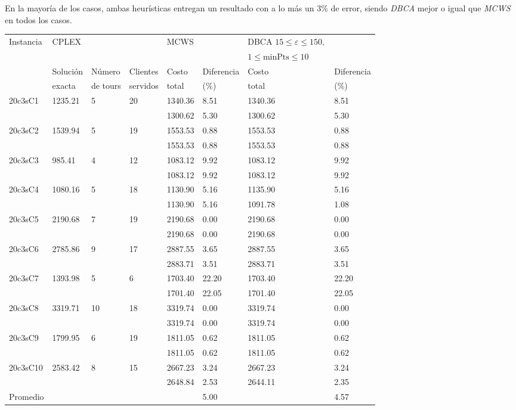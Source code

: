 \documentclass[letter, 10pt]{article}
\begin{document}
\begin{itemize}
\bigskip
En la mayoría de los casos, ambas heurísticas entregan un resultado con a lo más un \(3\)\% de error,
siendo \textit{DBCA} mejor o igual que \textit{MCWS} en todos los casos.

\begin{tabular}{|l|lll|ll|ll|}
\hline
Instancia & CPLEX &&&MCWS&&DBCA \(15 \leq \varepsilon \leq 150,\) &\\ 
			&	&&&&& \(1 \leq \mbox{minPts} \leq 10\)& \\ \hline
		& Solución  & Número & Clientes & Costo  & Diferencia & Costo & Diferencia \\
		& exacta		& de tours 	& servidos & total & (\%)&total & (\%)\\ \hline
20c3sC1 & 1235.21 & 5 & 20 & 1340.36 & 8.51 & 1340.36 & 8.51 \\
		&			&	&	&1300.62 & 5.30 & 1300.62 & 5.30 \\ \hline
20c3sC2 & 1539.94 & 5 & 19 & 1553.53 & 0.88 & 1553.53 & 0.88 \\
		&			&	&	&1553.53 & 0.88 & 1553.53 & 0.88 \\\hline
20c3sC3 &  985.41& 4 & 12 & 1083.12 &  9.92 & 1083.12 & 9.92 \\
		&			&	&	&1083.12 &  9.92 & 1083.12 & 9.92 \\	\hline			
20c3sC4 & 1080.16 & 5 & 18 & 1130.90 & 5.16 & 1135.90 & 5.16 \\
		&			&	&	&1130.90 & 5.16 & 1091.78 & 1.08 \\\hline
20c3sC5 & 2190.68 & 7 & 19 & 2190.68 & 0.00 & 2190.68 & 0.00 \\
		&			&	&	&2190.68 & 0.00 & 2190.68 & 0.00 \\	\hline
20c3sC6 & 2785.86 & 9 & 17 & 2887.55 & 3.65 & 2887.55 & 3.65 \\
		&			&	&	&2883.71 & 3.51 & 2883.71 & 3.51 \\\hline
20c3sC7 & 1393.98 & 5 & 6  & 1703.40 &22.20 & 1703.40 &22.20 \\
		&			&	&	&1701.40 &22.05 & 1701.40 &22.05 \\\hline
20c3sC8 & 3319.71 &10 & 18 & 3319.74 & 0.00 & 3319.74 & 0.00 \\
		&			&	&	&3319.74 & 0.00 & 3319.74 & 0.00 \\\hline
20c3sC9 & 1799.95 & 6 & 19 & 1811.05 & 0.62 & 1811.05 & 0.62 \\
		&			&	&	&1811.05 & 0.62 & 1811.05 & 0.62 \\\hline
20c3sC10& 2583.42 & 8 & 15 & 2667.23 & 3.24 & 2667.23 & 3.24 \\
		&			&	&	&2648.84 & 2.53 & 2644.11 & 2.35 \\\hline
Promedio & &&&& 5.00 &&4.57 \\ \hline										
\end{tabular}


\end{itemize}
\end{document}

